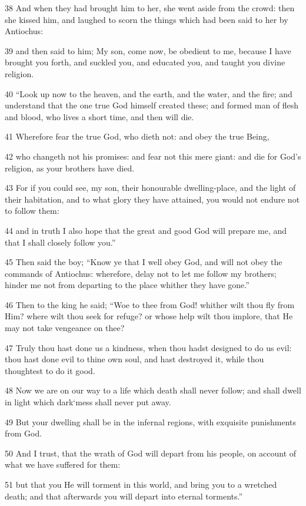 38 And when they had brought him to her, she went aside from the crowd: then she kissed him, and laughed to scorn the things which had been said to her by Antiochus: 

39 and then said to him; My son, come now, be obedient to me, because I have brought you forth, and suckled you, and educated you, and taught you divine religion. 

40 “Look up now to the heaven, and the earth, and the water, and the fire; and understand that the one true God himself created these; and formed man of flesh and blood, who lives a short time, and then will die. 

41 Wherefore fear the true God, who dieth not: and obey the true Being, 

42 who changeth not his promises: and fear not this mere giant: and die for God’s religion, as your brothers have died. 

43 For if you could see, my son, their honourable dwelling-place, and the light of their habitation, and to what glory they have attained, you would not endure not to follow them: 

44 and in truth I also hope that the great and good God will prepare me, and that I shall closely follow you.” 

45 Then said the boy; “Know ye that I well obey God, and will not obey the commands of Antiochus: wherefore, delay not to let me follow my brothers; hinder me not from departing to the place whither they have gone.” 

46 Then to the king he said; “Woe to thee from God! whither wilt thou fly from Him? where wilt thou seek for refuge? or whose help wilt thou implore, that He may not take vengeance on thee? 

47 Truly thou hast done us a kindness, when thou hadst designed to do us evil: thou hast done evil to thine own soul, and hast destroyed it, while thou thoughtest to do it good. 

48 Now we are on our way to a life which death shall never follow; and shall dwell in light which dark‘mess shall never put away. 

49 But your dwelling shall be in the infernal regions, with exquisite punishments from God. 

50 And I trust, that the wrath of God will depart from his people, on account of what we have suffered for them: 

51 but that you He will torment in this world, and bring you to a wretched death; and that afterwards you will depart into eternal torments.” 

